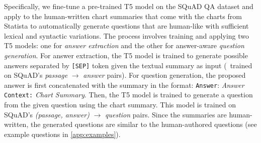 Specifically, we fine-tune a pre-trained T5 model on the SQuAD QA dataset  \cite{squadv1} and apply to the human-written chart summaries that come with the charts from Statista to automatically generate questions that are human-like with sufficient lexical and  syntactic variations. The process involves training and applying two T5 models: one for \emph{answer extraction} and the other for answer-aware \emph{question generation}. For answer extraction, the T5 model is trained to generate possible answers separated by \texttt{[SEP]} token given the textual summary as input (\ie\ trained on SQuAD's \emph{passage} $\rightarrow$ \emph{answer} pairs). For question generation, the proposed answer is first concatenated with the summary in the  format: \texttt{Answer}: \textit{Answer} \texttt{Context:} \textit{Chart Summary}.  Then, the T5 model is trained to generate a question from the given question using the chart summary. This model is trained on SQuAD's \emph{(passage, answer)} $\rightarrow$ \emph{question} pairs. Since the summaries are human-written, the generated questions are similar to the human-authored questions (see example questions in \ref{app:examples}).



\begin{table}[t!]
\centering
\small 
{}
\caption{\small Our dataset statistics for each split.
}
\label{tab:splits}
\end{table}


